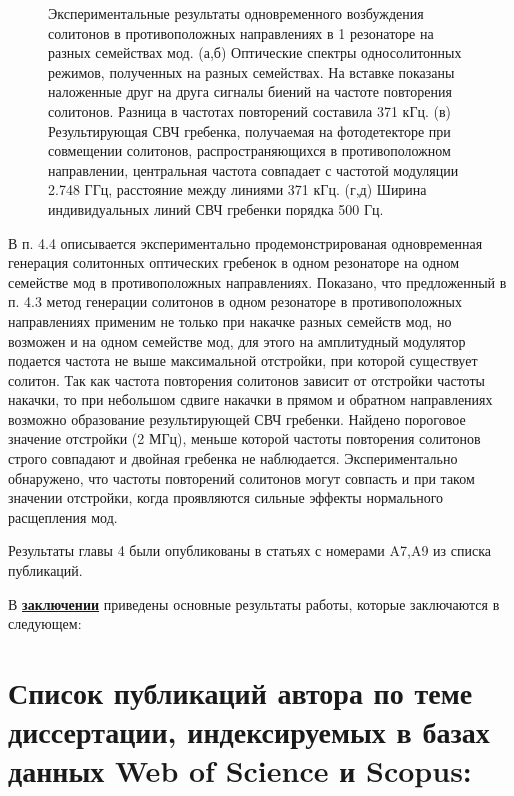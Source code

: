\begin{figure}[!htb]
\begin{minipage}{1\linewidth}
\end{minipage}
\setlength{\belowcaptionskip}{4pt}
\caption{Экспериментальные результаты одновременного возбуждения солитонов в противоположных направлениях в 1 резонаторе на разных семействах мод. (а,б) Оптические спектры односолитонных режимов, полученных на разных семействах. На вставке показаны наложенные друг на друга сигналы биений на частоте повторения солитонов. Разница в частотах повторений составила 371 кГц. (в) Результирующая СВЧ гребенка, получаемая на фотодетекторе при совмещении солитонов, распространяющихся в противоположном направлении, центральная частота совпадает с частотой модуляции 2.748 ГГц, расстояние между линиями 371 кГц. (г,д) Ширина индивидуальных линий СВЧ гребенки порядка 500 Гц.}
\label{counter_prop_results}
\end{figure}

В п. 4.4 описывается экспериментально продемонстрированая одновременная генерация солитонных оптических гребенок в одном резонаторе на одном семействе мод в противоположных направлениях. Показано, что предложенный в п. 4.3 метод генерации солитонов в одном резонаторе в противоположных направлениях применим не только при накачке разных семейств мод, но возможен и на одном семействе мод, для этого на амплитудный модулятор подается частота не выше максимальной отстройки, при которой существует солитон. Так как частота повторения солитонов зависит от отстройки частоты накачки, то при небольшом сдвиге накачки в прямом и обратном направлениях возможно образование результирующей СВЧ гребенки. Найдено пороговое значение отстройки (2 МГц), меньше которой частоты повторения солитонов строго совпадают и двойная гребенка не наблюдается. Экспериментально обнаружено, что частоты повторений солитонов могут совпасть и при таком значении отстройки, когда проявляются сильные эффекты нормального расщепления мод.

Результаты главы 4 были опубликованы в статьях с номерами A7,A9 из списка публикаций.

В \underline{\textbf{заключении}} приведены основные результаты работы, которые заключаются в следующем:



\section*{Список публикаций автора по теме диссертации, индексируемых в базах данных Web of Science и Scopus:}

